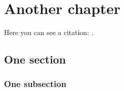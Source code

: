 \chapter{Another chapter}
Here you can see a citation: \cite{atc13}.

\lipsum[7]

\section{One section}

\lipsum[3]

\subsection{One subsection}

\lipsum[3]
